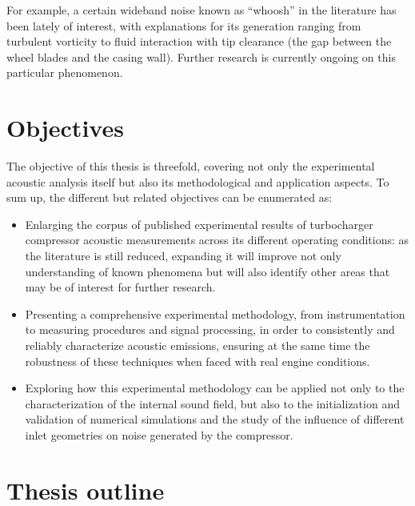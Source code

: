 For example, a certain wideband noise known as ``whoosh'' in the literature has been lately of interest, with explanations for its generation ranging from turbulent vorticity to fluid interaction with tip clearance (the gap between the wheel blades and the casing wall). Further research is currently ongoing on this particular phenomenon.


\section{Objectives}

The objective of this thesis is threefold, covering not only the experimental acoustic analysis itself but also its methodological and application aspects. To sum up, the different but related objectives can be enumerated as: 

\begin{itemize}
	\item Enlarging the corpus of published experimental results of turbocharger compressor acoustic measurements across its different operating conditions: as the literature is still reduced, expanding it will improve not only understanding of known phenomena but will also identify other areas that may be of interest for further research.

	\item Presenting a comprehensive experimental methodology, from instrumentation to measuring procedures and signal processing, in order to consistently and reliably characterize acoustic emissions, ensuring at the same time the robustness of these techniques when faced with real engine conditions.

	\item Exploring how this experimental methodology can be applied not only to the characterization of the internal sound field, but also to the initialization and validation of numerical simulations and the study of the influence of different inlet geometries on noise generated by the compressor.
\end{itemize}

\section{Thesis outline}

